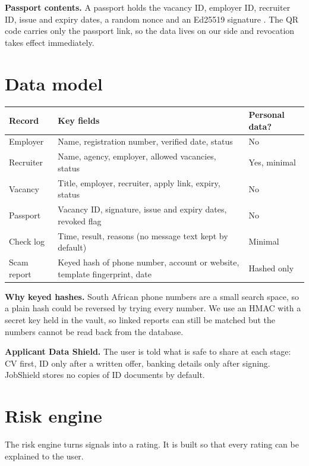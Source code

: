 \documentclass[11pt,a4paper]{article}
\newcommand{\tbl}[1]{\textbf{#1}}
\begin{document}
\textbf{Passport contents.} A passport holds the vacancy ID, employer ID, recruiter ID, issue and expiry dates, a random nonce and an Ed25519 signature \cite{rfc8032}. The QR code carries only the passport link, so the data lives on our side and revocation takes effect immediately.

\section{Data model}
\begin{center}
\small
\begin{tabularx}{\textwidth}{@{}>{\raggedright\arraybackslash}p{2.4cm}>{\raggedright\arraybackslash}X>{\raggedright\arraybackslash}p{3.2cm}@{}}
\toprule
\tbl{Record} & \tbl{Key fields} & \tbl{Personal data?}\\
\midrule
Employer & Name, registration number, verified date, status & No\\
Recruiter & Name, agency, employer, allowed vacancies, status & Yes, minimal\\
Vacancy & Title, employer, recruiter, apply link, expiry, status & No\\
Passport & Vacancy ID, signature, issue and expiry dates, revoked flag & No\\
Check log & Time, result, reasons (no message text kept by default) & Minimal\\
Scam report & Keyed hash of phone number, account or website, template fingerprint, date & Hashed only\\
\bottomrule
\end{tabularx}
\end{center}

\textbf{Why keyed hashes.} South African phone numbers are a small search space, so a plain hash could be reversed by trying every number. We use an HMAC with a secret key held in the vault, so linked reports can still be matched but the numbers cannot be read back from the database.

\textbf{Applicant Data Shield.} The user is told what is safe to share at each stage: CV first, ID only after a written offer, banking details only after signing. JobShield stores no copies of ID documents by default.

\section{Risk engine}
The risk engine turns signals into a rating. It is built so that every rating can be explained to the user.
\end{document}
